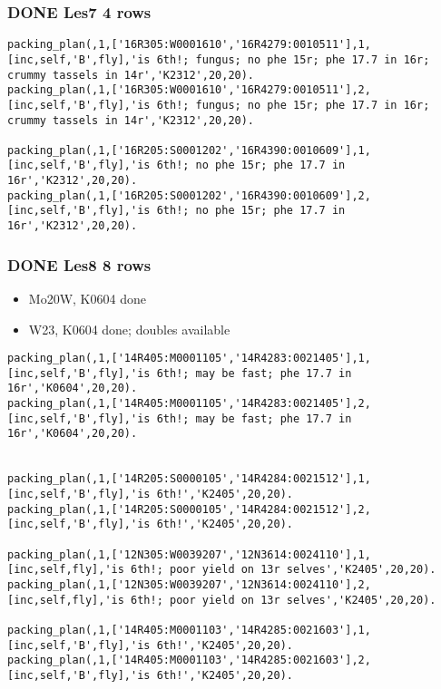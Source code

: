 \documentclass[11pt]{article}
\begin{document}
\subsubsection{{\bfseries\sffamily DONE} Les7  4 rows}
\label{sec-4-1-3}

\begin{verbatim}
packing_plan(,1,['16R305:W0001610','16R4279:0010511'],1,[inc,self,'B',fly],'is 6th!; fungus; no phe 15r; phe 17.7 in 16r; crummy tassels in 14r','K2312',20,20).
packing_plan(,1,['16R305:W0001610','16R4279:0010511'],2,[inc,self,'B',fly],'is 6th!; fungus; no phe 15r; phe 17.7 in 16r; crummy tassels in 14r','K2312',20,20).

packing_plan(,1,['16R205:S0001202','16R4390:0010609'],1,[inc,self,'B',fly],'is 6th!; no phe 15r; phe 17.7 in 16r','K2312',20,20).
packing_plan(,1,['16R205:S0001202','16R4390:0010609'],2,[inc,self,'B',fly],'is 6th!; no phe 15r; phe 17.7 in 16r','K2312',20,20).
\end{verbatim}



\subsubsection{{\bfseries\sffamily DONE} Les8  8 rows}
\label{sec-4-1-4}

\begin{itemize}
\item Mo20W, K0604 done

\item W23, K0604 done; doubles available
\end{itemize}


\begin{verbatim}
packing_plan(,1,['14R405:M0001105','14R4283:0021405'],1,[inc,self,'B',fly],'is 6th!; may be fast; phe 17.7 in 16r','K0604',20,20).
packing_plan(,1,['14R405:M0001105','14R4283:0021405'],2,[inc,self,'B',fly],'is 6th!; may be fast; phe 17.7 in 16r','K0604',20,20).


packing_plan(,1,['14R205:S0000105','14R4284:0021512'],1,[inc,self,'B',fly],'is 6th!','K2405',20,20).
packing_plan(,1,['14R205:S0000105','14R4284:0021512'],2,[inc,self,'B',fly],'is 6th!','K2405',20,20).

packing_plan(,1,['12N305:W0039207','12N3614:0024110'],1,[inc,self,fly],'is 6th!; poor yield on 13r selves','K2405',20,20).
packing_plan(,1,['12N305:W0039207','12N3614:0024110'],2,[inc,self,fly],'is 6th!; poor yield on 13r selves','K2405',20,20).

packing_plan(,1,['14R405:M0001103','14R4285:0021603'],1,[inc,self,'B',fly],'is 6th!','K2405',20,20).
packing_plan(,1,['14R405:M0001103','14R4285:0021603'],2,[inc,self,'B',fly],'is 6th!','K2405',20,20).
\end{verbatim}
\end{document}
